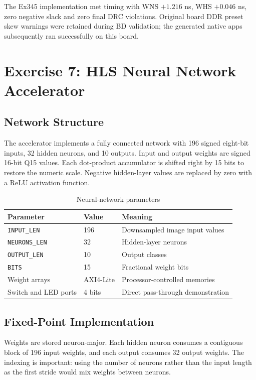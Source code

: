 \documentclass[11pt,a4paper]{article}
\begin{document}
The Ex345 implementation met timing with WNS $+1.216$ ns, WHS $+0.046$ ns,
zero negative slack and zero final DRC violations. Original board DDR preset
skew warnings were retained during BD validation; the generated native apps
subsequently ran successfully on this board.

\section{Exercise 7: HLS Neural Network Accelerator}

\subsection{Network Structure}
The accelerator implements a fully connected network with 196 signed eight-bit
inputs, 32 hidden neurons, and 10 outputs. Input and output weights are signed
16-bit Q15 values. Each dot-product accumulator is shifted right by 15 bits to
restore the numeric scale. Negative hidden-layer values are replaced by zero
with a ReLU activation function.

\begin{table}[H]
\centering
\caption{Neural-network parameters}
\begin{tabularx}{\textwidth}{p{3.1cm} p{2.3cm} X}
\toprule
\textbf{Parameter} & \textbf{Value} & \textbf{Meaning} \\
\midrule
\texttt{INPUT\_LEN} & 196 & Downsampled image input values \\
\texttt{NEURONS\_LEN} & 32 & Hidden-layer neurons \\
\texttt{OUTPUT\_LEN} & 10 & Output classes \\
\texttt{BITS} & 15 & Fractional weight bits \\
Weight arrays & AXI4-Lite & Processor-controlled memories \\
Switch and LED ports & 4 bits & Direct pass-through demonstration \\
\bottomrule
\end{tabularx}
\end{table}

\subsection{Fixed-Point Implementation}
Weights are stored neuron-major. Each hidden neuron consumes a contiguous block
of 196 input weights, and each output consumes 32 output weights. The indexing is
important: using the number of neurons rather than the input length as the first
stride would mix weights between neurons.
\end{document}
